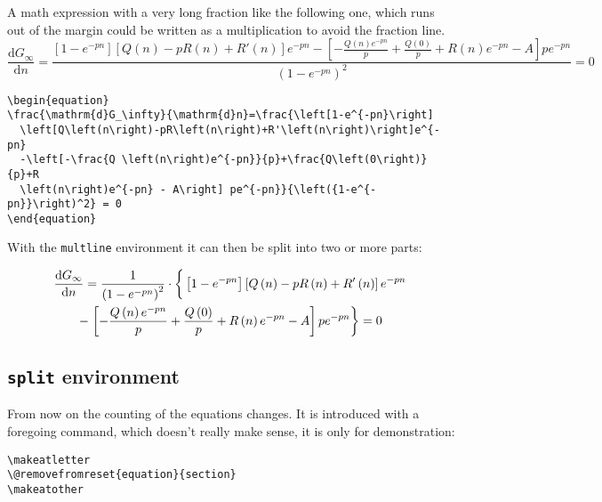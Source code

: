\begin{table}[htb]
A math expression with a very long fraction like the following one, which runs out 
of the margin
could be written as a multiplication to avoid the fraction line.
%
\begin{equation}
\frac{\mathrm{d}G_\infty}{\mathrm{d}n}=\frac{\left[1-e^{-pn}\right] 
  \left[Q\left(n\right)-pR\left(n\right)+R'\left(n\right)\right]e^{-pn}
  -\left[-\frac{Q \left(n\right)e^{-pn}}{p}+\frac{Q\left(0\right)}{p}+R
  \left(n\right)e^{-pn} - A\right] pe^{-pn}}{\left({1-e^{-pn}}\right)^2} = 0
\end{equation}
%
\begin{lstlisting}[xleftmargin=-1cm,xrightmargin=-1.5cm]
\begin{equation}
\frac{\mathrm{d}G_\infty}{\mathrm{d}n}=\frac{\left[1-e^{-pn}\right] 
  \left[Q\left(n\right)-pR\left(n\right)+R'\left(n\right)\right]e^{-pn}
  -\left[-\frac{Q \left(n\right)e^{-pn}}{p}+\frac{Q\left(0\right)}{p}+R
  \left(n\right)e^{-pn} - A\right] pe^{-pn}}{\left({1-e^{-pn}}\right)^2} = 0
\end{equation}
\end{lstlisting}
%
With the \verb+multline+ environment it can then be split into two or more parts:
%
\begin{LTXexample}[pos=t,xleftmargin=-1cm,xrightmargin=-1.5cm]
\begin{multline}
\frac{\mathrm{d}G_\infty}{\mathrm{d}n} = 
      \frac{1}{\left( {1-e^{-pn}} \right)^2 }\cdot
      \left\{\vphantom{\frac{Q}{p}}%
      \left[ 1-e^{-pn} \right] \left[ Q \left( n \right) - pR 
      \left( n \right) + R'\left( n \right) \right]e^{-pn}\right.\\
    - \left.\left[-\frac{Q \left( n \right) e^{-pn}}{p} + 
    \frac{Q \left( 0 \right)}{p} + R \left( n \right) e^{-pn} 
    - A\right] pe^{-pn}\right\} = 0
\end{multline}
\end{LTXexample}



\subsection{\texttt{split} environment}\label{split}

%
\makeatletter
{}
\makeatother
%
\begin{leftbar}
\noindent From now on the counting of the equations changes. It is introduced with a 
foregoing command, which doesn't really make sense, it is only 
for demonstration: 
\begin{lstlisting}
\makeatletter
\@removefromreset{equation}{section}
\makeatother
\end{lstlisting}
\end{leftbar}



\end{table}
